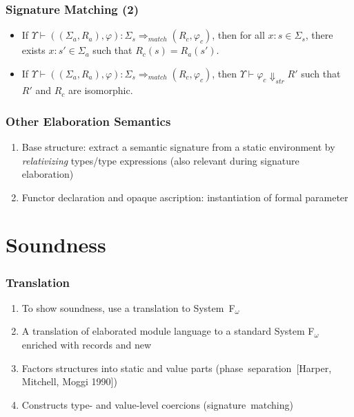\documentclass{beamer}
\begin{document}
	\begin{frame}
		\frametitle{Signature Matching (2)}
		\begin{itemize}[<+->]
			\itemsep=2cm
			\item[]
		If $\Upsilon\vdash ((\Sigma_a, R_a), \varphi) : \Sigma_s \Rightarrow_{match} (R_c, \varphi_c)$, then for all $x : s\in \Sigma_s$, there exists $x : s'\in \Sigma_a$ such that $R_c(s) = R_a(s')$.
		\item[]
		If $\Upsilon\vdash ((\Sigma_a, R_a), \varphi) : \Sigma_s \Rightarrow_{match} (R_c, \varphi_c)$, then $\Upsilon\vdash \varphi_c \Downarrow_{str} R'$ such that $R'$ and $R_c$ are isomorphic.
		\end{itemize}
	\end{frame}
		
	\begin{frame}
		\frametitle{Other Elaboration Semantics}
		\begin{enumerate}[<+->]
			\item Base structure: extract a semantic signature from a static environment by \emph{relativizing} types/type expressions (also relevant during signature elaboration)
			\item Functor declaration and opaque ascription: instantiation of formal parameter
		\end{enumerate}
	\end{frame}
	
	\section{Soundness}
	\begin{frame}
		\frametitle{Translation}
		
		\begin{enumerate}[<+->]
			\itemsep=4mm
			\item To show soundness, use a translation to System~F$_\omega$
			\item A translation of elaborated module language to a standard System F$_\omega$ enriched with records and new 
			\item Factors structures into static and value parts (phase~separation~[Harper, Mitchell, Moggi 1990])
			\item Constructs type- and value-level coercions (signature~matching)
		\end{enumerate}
	\end{frame}
	
\end{document}
